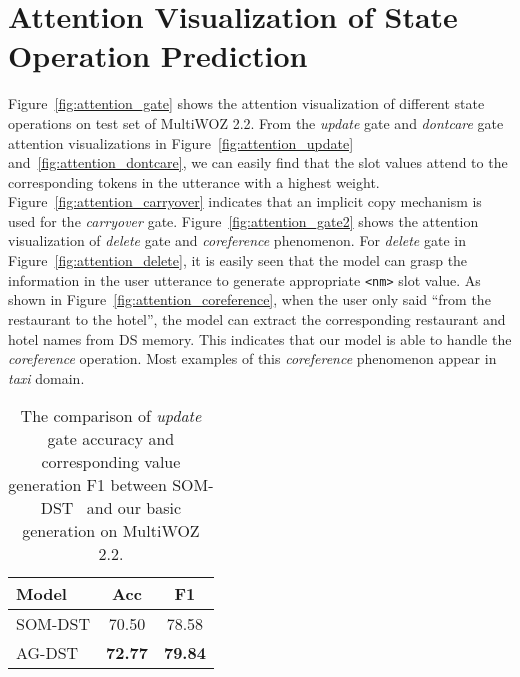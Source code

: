 \documentclass[11pt]{article}
\begin{document}
\section{Attention Visualization of State Operation Prediction}

Figure~\ref{fig:attention_gate} shows the attention visualization of different state operations on test set of MultiWOZ 2.2. From the \textit{update} gate and \textit{dontcare} gate attention visualizations in Figure~\ref{fig:attention_update} and~\ref{fig:attention_dontcare}, we can easily find that the slot values attend to the corresponding tokens in the utterance with a highest weight. Figure~\ref{fig:attention_carryover} indicates that an implicit copy mechanism is used for the \textit{carryover} gate. Figure~\ref{fig:attention_gate2} shows the attention visualization of \textit{delete} gate and \textit{coreference} phenomenon. For \textit{delete} gate in Figure~\ref{fig:attention_delete}, it is easily seen that the model can grasp the information in the user utterance to generate appropriate \texttt{<nm>} slot value. As shown in Figure~\ref{fig:attention_coreference}, when the user only said ``from the restaurant to the hotel'', the model can extract the corresponding restaurant and hotel names from DS memory. This indicates that our model is able to handle the \textit{coreference} operation. Most examples of this \textit{coreference} phenomenon appear in \textit{taxi} domain.

\begin{table}
\centering
\begin{tabular}{lcc}
\hline
\textbf{Model} & \textbf{Acc} & \textbf{F1} \\
\hline
\hline
SOM-DST & 70.50 & 78.58 \\
AG-DST & \textbf{72.77} & \textbf{79.84} \\
\hline
\end{tabular}
\caption{The comparison of \textit{update} gate accuracy and corresponding value generation F1 between SOM-DST~\citep{kim-etal-2020-efficient} and our basic generation on MultiWOZ 2.2.}\label{tab:gate}
\end{table}

\begin{figure*}
	\centering
	\hspace{4em}
	\caption{The attention visualization of \textit{delete} gate and \textit{coreference} phenomenon on MultiWOZ 2.2.}
	\label{fig:attention_gate2}
\end{figure*}
\end{document}
